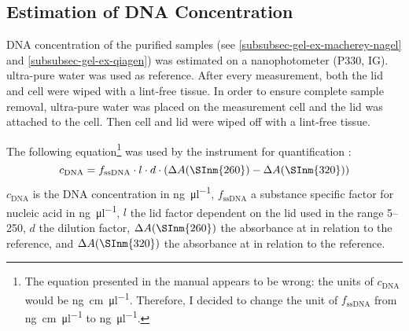 \subsection{Estimation of DNA Concentration}
DNA concentration of the purified samples (see \vref{subsubsec-gel-ex-macherey-nagel} and \vref{subsubsec-gel-ex-qiagen}) was estimated on a nanophotometer (P330, IG).  ultra-pure water was used as reference. After every measurement, both the lid and cell were wiped with a lint-free tissue. In order to ensure complete sample removal,  ultra-pure water was placed on the measurement cell and the lid was attached to the cell. Then cell and lid were wiped off with a lint-free tissue.

The following equation\footnote{The equation presented in the manual appears to be wrong: the units of $c_{\text{DNA}}$ would be \si{\nano\gram\centi\metre\per\micro\litre}. Therefore, I decided to change the unit of $f_{\text{ssDNA}}$ from \si{\nano\gram\centi\metre\per\micro\litre} to \si{\nano\gram\per\micro\litre}.} was used by the instrument for quantification \cite{Implen2013}:
\begin{equation}
	c_{\text{DNA}} = f_{\text{ssDNA}} \cdot l \cdot d \cdot (\Delta{}A(\SInm{260}) - \Delta{}A(\SInm{320}))
\end{equation}
$c_{\text{DNA}}$ is the DNA concentration in \si{\nano\gram\per\micro\litre}, $f_{\text{ssDNA}}$ a substance specific factor for nucleic acid in \si{\nano\gram\per\micro\litre}, $l$ the lid factor dependent on the lid used in the range \numrange{5}{250}, $d$ the dilution factor, $\Delta{}A(\SInm{260})$ the absorbance at  in relation to the reference, and $\Delta{}A(\SInm{320})$ the absorbance at  in relation to the reference.

